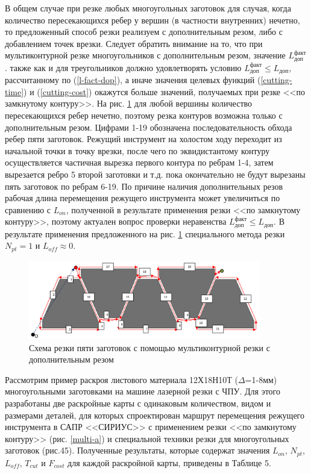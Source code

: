 \documentclass[11pt,twoside]{report}
\begin{document}
В общем случае при резке любых многоугольных
заготовок для случая,
когда количество пересекающихся ребер у вершин
(в частности внутренних) нечетно,
то предложенный способ резки реализуем с
дополнительным резом, либо с добавлением точек врезки.
Следует обратить внимание на то,
что при мультиконтурной резке многоугольников с
дополнительным резом, значение
$L_\text{доп}^\text{факт}$.
также как и для треугольников должно удовлетворять условию
$L_\text{доп}^\text{факт} \leqslant L_\text{доп}$,
рассчитанному по (\ref{l-fact-dop}),
а иначе значения целевых функций (\ref{cutting-time})
и (\ref{cutting-cost})
окажутся больше значений,
получаемых  при резке <<по замкнутому контуру>>.
На рис. \ref{5-extra}
для любой вершины количество пересекающихся ребер нечетно,
поэтому резка контуров возможна только с дополнительным резом.
Цифрами 1-19 обозначена последовательность обхода ребер
пяти заготовок.
Режущий инструмент на холостом ходу переходит
из начальной точки в точку врезки,
после чего по эквидистантому контуру
осуществляется частичная вырезка первого
контура по ребрам 1-4,
затем вырезается ребро 5 второй заготовки и т.д.
пока окончательно не будут вырезаны пять заготовок по ребрам 6-19.
По причине наличия дополнительных резов рабочая
длина перемещения режущего инструмента может увеличиться по сравнению с $L_{on}$,
полученной в результате применения резки <<по замкнутому контуру>>,
поэтому актуален вопрос проверки неравенства
$L_\text{доп}^\text{факт} \leqslant L_\text{доп}$.
В результате применения предложенного на рис. \ref{5-extra}
специального метода резки
$N_{pt}=1$
и $L_{off} \approx 0$.

\begin{figure}
  \begin{center}
  \includegraphics[width=0.9\textwidth]{5-extra.png}
  \caption{Схема резки пяти заготовок с помощью мультиконтурной резки с дополнительным резом}
  \label{5-extra}
  \end{center}
\end{figure}

Рассмотрим пример раскроя листового материала
12Х18Н10Т ($\Delta$=1-8мм)
многоугольными заготовками на машине лазерной резки с ЧПУ.
Для этого разработаны две раскройные карты с одинаковым количеством,
видом и размерами деталей,
для которых спроектирован маршрут перемещения
режущего инструмента в САПР <<СИРИУС>> с
применением резки <<по замкнутому контуру>> (рис. \ref{multi-a})
и специальной техники резки для многоугольных заготовок (рис.45).
Полученные результаты, которые содержат значения
$L_{on}$, $N_{pt}$, $L_{off}$, $T_{cut}$ и $F_{cost}$
для каждой раскройной карты, приведены в Таблице 5.
\end{document}
